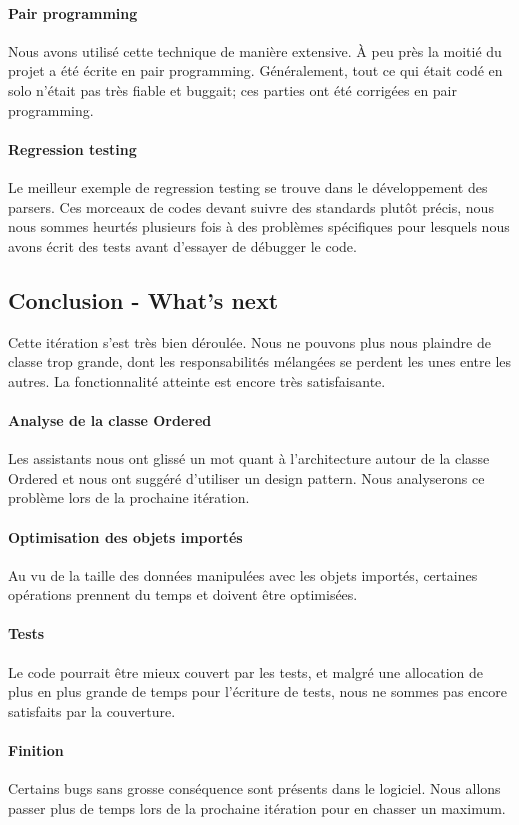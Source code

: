 	\paragraph{Pair programming}
	Nous avons utilisé cette technique de manière extensive. À peu près la moitié
	du projet a été écrite en pair programming. Généralement, tout ce qui était
	codé en solo n'était pas très fiable et buggait; ces parties ont été corrigées
	en pair programming.

	\paragraph{Regression testing}
	Le meilleur exemple de regression testing se trouve dans le développement des
	parsers. Ces morceaux de codes devant suivre des standards plutôt précis, nous
	nous sommes heurtés plusieurs fois à des problèmes spécifiques pour lesquels
	nous avons écrit des tests avant d'essayer de débugger le code.

\subsection{Conclusion - What's next}

	Cette itération s'est très bien déroulée. Nous ne pouvons plus nous plaindre
	de classe trop grande, dont les responsabilités mélangées se perdent les unes
	entre les autres. La fonctionnalité atteinte est encore très satisfaisante.

	\paragraph{Analyse de la classe Ordered}
	Les assistants nous ont glissé un mot quant à l'architecture autour de la
	classe Ordered et nous ont suggéré d'utiliser un design pattern. Nous analyserons
	ce problème lors de la prochaine itération.

	\paragraph{Optimisation des objets importés}
	Au vu de la taille des données manipulées avec les objets importés, certaines
	opérations prennent du temps et doivent être optimisées.
	
	\paragraph{Tests}
	Le code pourrait être mieux couvert par les tests, et malgré une allocation
	de plus en plus grande de temps pour l'écriture de tests, nous ne sommes pas
	encore satisfaits par la couverture.
	
	\paragraph{Finition}
	Certains bugs sans grosse conséquence sont présents dans le logiciel. Nous allons
	passer plus de temps lors de la prochaine itération pour en chasser un maximum.

